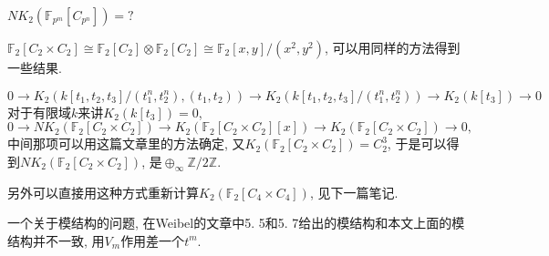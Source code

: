 $NK_2(\mathbb{F}_{p^m}[C_{p^n}])=?$

$\mathbb{F}_2[C_2\times C_2] \cong\mathbb{F}_2[C_2]\otimes\mathbb{F}_2[C_2] \cong \mathbb{F}_2[x, y]/(x^2, y^2)$, 可以用同样的方法得到一些结果. 



\[
	0\longrightarrow K_2(k[t_1, t_2, t_3]/(t_1^n, t_2^n), (t_1, t_2)) \longrightarrow K_2(k[t_1, t_2, t_3]/(t_1^n, t_2^n)) \longrightarrow K_2(k[t_3]) \longrightarrow 0
	\]
对于有限域$k$来讲$K_2(k[t_3])=0$, 
\[0\longrightarrow NK_2(\mathbb{F}_2[C_{2}\times C_2]) \longrightarrow K_2(\mathbb{F}_2[C_{2}\times C_2][x])\longrightarrow K_2(\mathbb{F}_2[C_{2}\times C_2]) \longrightarrow 0, \]
中间那项可以用这篇文章里的方法确定, 又$K_2(\mathbb{F}_2[C_{2}\times C_2])=C_2^3$, 于是可以得到$NK_2(\mathbb{F}_2[C_{2}\times C_2])$, 是$\oplus_{\infty} \mathbb{Z}/2 \mathbb{Z}$. 

另外可以直接用这种方式重新计算$K_2(\mathbb{F}_2[C_4\times C_4])$, 见下一篇笔记. 


一个关于模结构的问题, 在Weibel的文章\cite{MR88f:18018}中5. 5和5. 7给出的模结构和本文上面的模结构并不一致, 用$V_m$作用差一个$t^m$. 